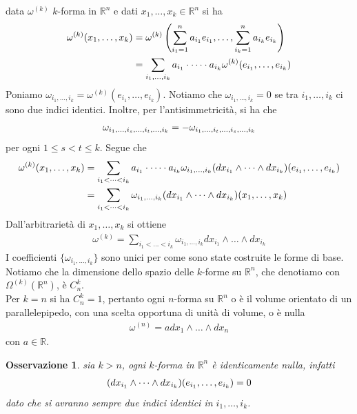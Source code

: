 \documentclass[oneside, 11pt]{amsbook}
\makeatletter
\newcommand{\0}{{(0)}}
\newcommand{\3}{{(3)}}
\theoremstyle{colonplain}
\theoremstyle{colondefinition}
\theoremstyle{colonremark}
\newtheorem{rmk}[thm]{Osservazione}
\numberwithin{equation}{chapter}
\renewcommand{\proofname}{Dimostrazione}
\renewenvironment{proof}[1][\proofname]{\par
  \pushQED{\qed}%
  \normalfont \topsep6\p@\@plus6\p@\relax
  \trivlist
  \item[\hskip\labelsep\bfseries #1:]\ignorespaces
}{%
  \popQED\endtrivlist\@endpefalse
}
\makeatother
\begin{document}
\begin{proof} data $\omega^{(k)}$ $k$-forma in $\mathbb{R}^n$ e dati $x_1, \dots, x_k \in \mathbb{R}^n$ si ha
\begin{align}
    \omega^{(k)}(x_1, \dots, x_k) &= \omega^{(k)}\left(\sum_{i_1 = 1}^n a_{i_1}e_{i_1}, \dots, \sum_{i_k = 1}^n a_{i_k}e_{i_k}\right) \notag \\
    &= \sum_{i_1, \dots, i_k} a_{i_1} \cdot \dots \cdot a_{i_k}\omega^{(k)}(e_{i_1}, \dots, e_{i_k}) \notag
\end{align}
Poniamo $\omega_{i_1, \dots, i_k} = \omega^{(k)}(e_{i_1}, \dots, e_{i_k})$. Notiamo che $\omega_{i_1, \dots, i_k} = 0$ se tra $i_1, \dots, i_k$ ci sono due indici identici. Inoltre, per l'antisimmetricità, si ha che \begin{align}
    \omega_{i_1, \dots, i_s, \dots, i_t, \dots, i_k} = -\omega_{i_1, \dots, i_t, \dots, i_s, \dots, i_k} \notag
\end{align}
per ogni $1 \leq s < t \leq k$. Segue che 
\begin{align}
    \omega^{(k)}(x_1, \dots, x_k) &= \sum_{i_1 < \dots < i_k}a_{i_1} \cdot \dots \cdot a_{i_k}\omega_{i_1, \dots, i_k}(dx_{i_1} \wedge \dots \wedge dx_{i_k})(e_{i_1}, \dots, e_{i_k}) \notag \\
    &= \sum_{i_1 < \dots < i_k} \omega_{i_1, \dots, i_k}(dx_{i_1} \wedge \dots \wedge dx_{i_k})(x_1, \dots, x_k) 
\end{align}
Dall'arbitrarietà di $x_1, \dots, x_k$ si ottiene 
\begin{align}
    \omega^{(k)} = \sum_{i_1 < \dots < i_k} \omega_{i_1, \dots, i_k}dx_{i_1} \wedge \dots \wedge dx_{i_k} 
\end{align}
I coefficienti $\{\omega_{i_1, \dots, i_k}\}$ sono unici per come sono state costruite le forme di base.
\end{proof}
Notiamo che la dimensione dello spazio delle $k$-forme su $\mathbb{R}^n$, che denotiamo con $\Omega^{(k)}(\mathbb{R}^n)$, è $C^k_n$. \\
Per $k = n$ si ha $C^k_n = 1$, pertanto ogni $n$-forma su $\mathbb{R}^n$ o è il volume orientato di un parallelepipedo, con una scelta opportuna di unità di volume, o è nulla
\begin{align}
    \omega^{(n)} = adx_1 \wedge \dots \wedge dx_n 
\end{align}
con $a \in \mathbb{R}$.
\begin{rmk} sia $k > n$, ogni $k$-forma in $\mathbb{R}^n$ è identicamente nulla, infatti 
\begin{align}
    (dx_{i_1} \wedge \dots \wedge dx_{i_k})(e_{i_1}, \dots, e_{i_k}) = 0 \notag
\end{align}
dato che si avranno sempre due indici identici in $i_1, \dots, i_k$.
\end{rmk}
\end{document}
